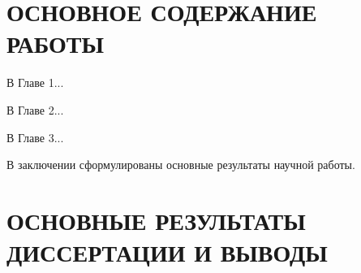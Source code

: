 \newcommand{\reliability}{\pdfbookmark[1]{Достоверность}{reliability}\paragraph{Достоверность результатов проведённых исследований.}}
\newcommand{\probation}{\pdfbookmark[1]{Апробация}{probation}\paragraph{Апробация работы.}}
\newcommand{\contribution}{\pdfbookmark[1]{Вклад}{contribution}\paragraph{Личный вклад автора.}}
\newcommand{\publications}{\pdfbookmark[1]{Публикации}{publications}\paragraph{Публикации по теме диссертации.}}




\section*{ОСНОВНОЕ СОДЕРЖАНИЕ РАБОТЫ}

В Главе 1...

В Главе 2...

В Главе 3...

В заключении сформулированы основные результаты научной работы.


\section*{ОСНОВНЫЕ РЕЗУЛЬТАТЫ ДИССЕРТАЦИИ И ВЫВОДЫ}


